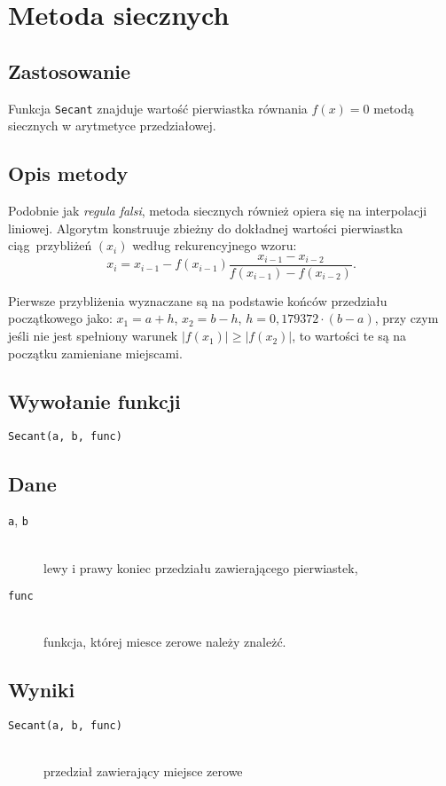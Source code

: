 \documentclass[12pt]{article}
\begin{document}
	\section{Metoda siecznych}
		\subsection{Zastosowanie}
    Funkcja \texttt{Secant} znajduje wartość pierwiastka równania
    $f(x) = 0$ metodą siecznych w arytmetyce przedziałowej.

		\subsection{Opis metody}
			Podobnie jak \textsl{regula falsi}, metoda siecznych również opiera się na interpolacji liniowej.
			Algorytm konstruuje zbieżny do dokładnej wartości pierwiastka ciąg~przybliżeń $(x_i)$ według rekurencyjnego wzoru:
			\begin{equation*}
				x_i = x_{i-1} - f(x_{i-1}) \frac{x_{i-1} - x_{i-2}}{f(x_{i-1}) - f(x_{i-2})}.
			\end{equation*}

			Pierwsze przybliżenia wyznaczane są na podstawie końców przedziału początkowego jako:
			$x_1 = a + h$, $x_2 = b - h$, $h = 0,179372 \cdot (b-a)$, przy czym jeśli nie jest spełniony warunek
			$|f(x_1)| \geq |f(x_2)|$, to wartości te są na początku zamieniane miejscami.

		\subsection{Wywołanie funkcji}
      \texttt{Secant(a, b, func)}

		\subsection{Dane}
      \begin{description}
        \item[\texttt{a}, \texttt{b}] \hfill\\ lewy i prawy koniec przedziału zawierającego pierwiastek,
        \item[\texttt{func}] \hfill\\ funkcja, której miesce zerowe należy znależć.
      \end{description}

		\subsection{Wyniki}
      \begin{description}
        \item[\texttt{Secant(a, b, func)}] \hfill\\
          przedział zawierający miejsce zerowe
      \end{description}
\end{document}
